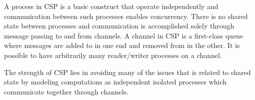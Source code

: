 A process in \ac{CSP} is a basic construct that operate independently and communication between such processes enables concurrency\cite{ibmCSP}. There is no shared state between processes and communication is accomplished solely through message passing to and from channels. A channel in \ac{CSP} is a first-class queue where messages are added to in one end and removed from in the other\cite[Chap. 6]{sevenModels}. It is possible to have arbitrarily many reader/writer processes on a channel. 

The strength of \ac{CSP} lies in avoiding many of the issues that is related to shared state by modeling computations as independent isolated processes which communicate together through channels. 

\worksheetend
